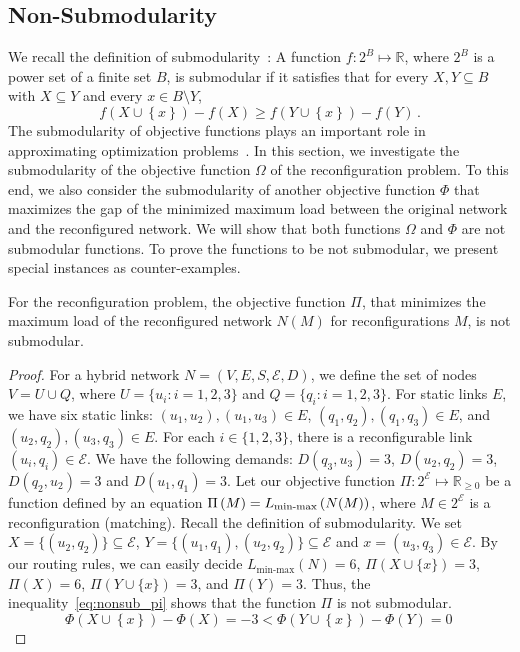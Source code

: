 \documentclass[sigconf]{acmart}
\newcommand{\E}{\mathcal{E}}  %
\begin{document}
\subsection{Non-Submodularity}\label{sec:sub}
We recall the definition of submodularity~\cite{Goemans:2009:ASF:1496770.1496829}: 
%
A function $f:2^{B}\mapsto \mathbb{R}$, where $2^{B}$ is a power set of a finite set $B$, is  submodular if it satisfies that for every $X,Y \subseteq B$ with $X\subseteq Y$ and every $x\in B \setminus Y$,
%
\[ f\left(X\cup\left\{x\right\}\right)-f\left(X \right)  \ge f\left(Y\cup\left\{x\right\}\right)-f\left(Y\right)\,.   \]
The submodularity of objective functions plays an important role in approximating optimization problems~\cite{Vazirani:2001:AA:500776}.  
%
In this section, we investigate the submodularity of the objective function $\Omega$ of the reconfiguration problem. 
%
To this end, we also consider the submodularity of another objective function $\Phi$ that maximizes the gap of the minimized maximum load between the original network and the reconfigured network. 
%
We will show that both functions $\Omega$ and $\Phi$ are not submodular functions. 
%
To prove the functions to be not submodular, we present special instances as counter-examples. 
%
\begin{theorem}
	For the reconfiguration problem, the objective function $\Pi$, that minimizes the maximum load of the reconfigured network $N(M)$ for reconfigurations $M$, is not submodular. 
\end{theorem}
\begin{proof}
	For a hybrid network $N=(V,E,S,\E,D)$, we define the set of nodes $V=U\cup Q$, where $U=\{u_i:i=1,2,3\}$ and $Q=\{q_i:i=1,2,3\}$. For static links $E$, we have  six static links: $(u_1,u_2), (u_1,u_3)\in E$, $(q_1,q_2),(q_1,q_3)\in E$, and $(u_2,q_2),(u_3,q_3)\in E$.  For each $i\in \{1,2,3\}$, there is  a reconfigurable link $(u_i,q_i)\in \E$. We have the following demands: $D(q_3,u_3)=3$, $D(u_2,q_2)=3$, $D(q_2,u_2)=3$ and $D(u_1,q_1)=3$.  Let our objective function $\Pi: 2^\E\mapsto \mathbb{R}_{\ge0}$ be a function defined by an equation $\Pi\left(M\right)=L_{\textnormal{min-max}}\left(N(M)\right)$, where  $M\in 2^\E$ is a reconfiguration (matching). Recall the definition of submodularity. We set $X=\{(u_2,q_2)\}\subseteq\E$, $Y=\{(u_1,q_1),(u_2,q_2)\}\subseteq\E$ and $x=(u_3,q_3)\in\E$. By our routing rules,  we can easily decide $L_{\text{min-max}}\left(N \right)=6$, $\Pi\left(X \cup\{x\}\right)=3$, $\Pi\left(X\right)=6$, $\Pi\left(Y\cup\{x\}\right)=3$, and $\Pi\left(Y\right)=3$. Thus, the inequality~\eqref{eq:nonsub_pi} shows that the function $\Pi$ is not submodular. 
	\begin{equation}
	\Phi\left(X\cup\left\{x\right\}\right)-\Phi\left(X \right)=-3  < \Phi\left(Y\cup\left\{x\right\}\right)-\Phi\left(Y\right)=0\, \label{eq:nonsub_pi}
	\end{equation}
\end{proof}
\end{document}
